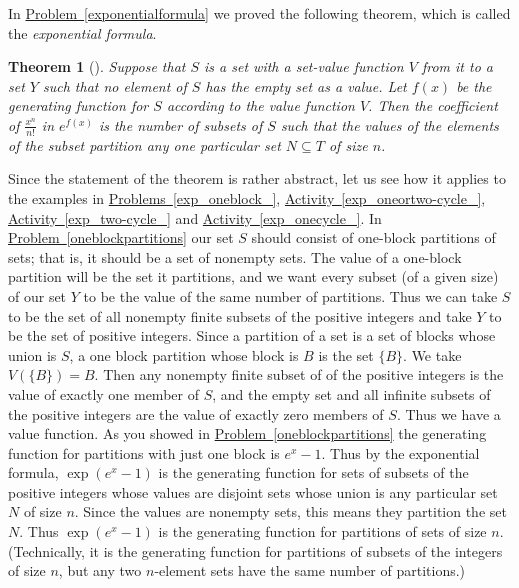 \documentclass[10pt,]{book}
\theoremstyle{plain}
\newtheorem{theorem}{Theorem}[section]
\theoremstyle{definition}
\numberwithin{equation}{chapter}
\begin{document}
In \hyperref[exponentialformula]{Problem~\ref{exponentialformula}} we proved the following theorem, which is called the \emph{exponential formula}.%
\begin{theorem}[{}]\label{theorem-14}
Suppose that \(S\) is a set with a set-value function \(V\) from it to a set \(Y\) such that no element of \(S\) has the empty set as a value. Let \(f(x)\) be the generating function for \(S\) according to the value function \(V\). Then the coefficient of \(\frac{x^n}{n!}\) in \(e^{f(x)}\) is the number of subsets of \(S\) such that the values of the elements of the subset partition any one particular set \(N\subseteq T\) of size \(n\).%
\end{theorem}
Since the statement of the theorem is rather abstract, let us see how it applies to the examples in \hyperref[exp_oneblock_]{Problems~\ref{exp_oneblock_}}, \hyperref[exp_oneortwo-cycle_]{Activity~\ref{exp_oneortwo-cycle_}}, \hyperref[exp_two-cycle_]{Activity~\ref{exp_two-cycle_}} and \hyperref[exp_onecycle_]{Activity~\ref{exp_onecycle_}}. In \hyperref[oneblockpartitions]{Problem~\ref{oneblockpartitions}} our set \(S\) should consist of one-block partitions of sets; that is, it should be a set of nonempty sets. The value of a one-block partition will be the set it partitions, and we want every subset (of a given size) of our set \(Y\) to be the value of the same number of partitions. Thus we can take \(S\) to be the set of all nonempty finite subsets of the positive integers and take \(Y\) to be the set of positive integers. Since a partition of a set is a set of blocks whose union is \(S\), a one block partition whose block is \(B\) is the set \(\{B\}\). We take \(V(\{B\}) =B\). Then any nonempty finite subset of of the positive integers is the value of exactly one member of \(S\), and the empty set and all infinite subsets of the positive integers are the value of exactly zero members of \(S\). Thus we have a value function. As you showed in \hyperref[oneblockpartitions]{Problem~\ref{oneblockpartitions}} the generating function for partitions with just one block is \(e^x-1\). Thus by the exponential formula, \(\exp(e^x-1)\) is the generating function for sets of subsets of the positive integers whose values are disjoint sets whose union is any particular set \(N\) of size \(n\). Since the values are nonempty sets, this means they partition the set \(N\). Thus \(\exp(e^x-1)\) is the generating function for partitions of sets of size \(n\). (Technically, it is the generating function for partitions of subsets of the integers of size \(n\), but any two \(n\)-element sets have the same number of partitions.)%
\end{document}
